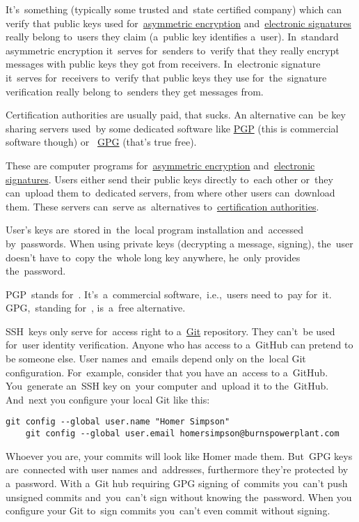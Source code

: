\label{certificationauthority}
It's~something (typically some trusted and~state certified company) which can verify that public keys used for~\hyperref[asymmetricencryption]{asymmetric encryption} and~\hyperref[electronicsignature]{electronic signatures} really belong to~users they claim (a~public key identifies a~user).
In~standard asymmetric encryption it~serves for~senders to~verify that they really encrypt messages with public keys they got from receivers.
In~electronic signature it~serves for~receivers to~verify that public keys they use for~the~signature verification really belong to~senders they get messages from.

Certification authorities are usually paid, that sucks.
An alternative can~be key sharing servers used~by some dedicated software like \hyperref[pgpgpg]{PGP} (this is commercial software though) or~ \hyperref[pgpgpg]{GPG} (that's true free).

\label{pgpgpg}
These are computer programs for~\hyperref[asymmetricencryption]{asymmetric encryption} and~\hyperref[electronicsignature]{electronic signatures}.
Users either send their public keys directly to~each other or~they can~upload them to~dedicated servers, from where other users can~download them.
These servers can~serve as~alternatives to~\hyperref[certificationauthority]{certification authorities}.

User's keys are~stored in~the~local program installation and~accessed by~passwords.
When using private keys (decrypting a message, signing), the~user doesn't have to~copy the~whole long key anywhere, he~only provides the~password.

PGP~stands for~.
It's~a~commercial software,~i.e.,~users need to~pay for~it.
GPG,~standing for~, is~a~free alternative.

\label{gitgpg}
SSH~keys only serve for~access right to a~\hyperref[git]{Git} repository.
They can't~be used for~user identity verification.
Anyone who has access to a~GitHub can pretend to be someone else.
User names and~emails depend only on the~local Git configuration.
For~example, consider that you have an~access to a~GitHub.
You~generate an~SSH key on~your computer and~upload it to the~GitHub.
And~next you configure your local Git like this:
\begin{lstlisting}[frame=no]
    git config --global user.name "Homer Simpson"
    git config --global user.email homersimpson@burnspowerplant.com
\end{lstlisting}
\noindent Whoever you are, your commits will look like Homer made them.
But~GPG keys are~connected with user names and~addresses, furthermore they're protected by a~password.
With a~Git hub requiring GPG signing of~commits you~can't push unsigned commits and~you~can't sign without knowing the~password.
When you configure your Git to~sign commits you~can't even commit without signing.

